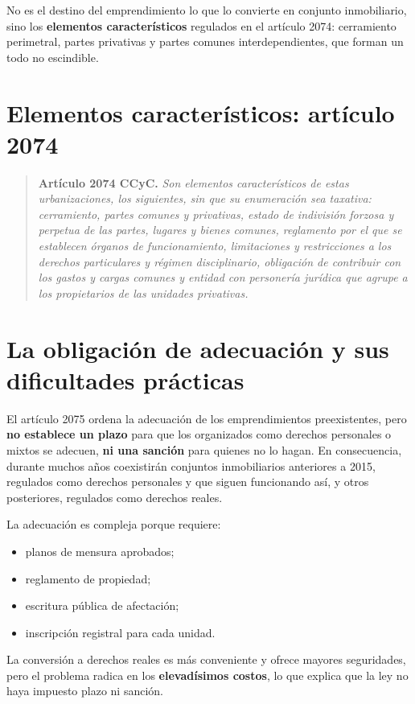 \documentclass[12pt,oneside]{book}
\begin{document}
No es el destino del emprendimiento lo que lo convierte en conjunto inmobiliario, sino los \textbf{elementos característicos} regulados en el artículo 2074: cerramiento perimetral, partes privativas y partes comunes interdependientes, que forman un todo no escindible.

\section{Elementos característicos: artículo 2074}

\begin{quote}
\textbf{Artículo 2074 CCyC.} \textit{Son elementos característicos de estas urbanizaciones, los siguientes, sin que su enumeración sea taxativa: cerramiento, partes comunes y privativas, estado de indivisión forzosa y perpetua de las partes, lugares y bienes comunes, reglamento por el que se establecen órganos de funcionamiento, limitaciones y restricciones a los derechos particulares y régimen disciplinario, obligación de contribuir con los gastos y cargas comunes y entidad con personería jurídica que agrupe a los propietarios de las unidades privativas.}
\end{quote}

\section{La obligación de adecuación y sus dificultades prácticas}

El artículo 2075 ordena la adecuación de los emprendimientos preexistentes, pero \textbf{no establece un plazo} para que los organizados como derechos personales o mixtos se adecuen, \textbf{ni una sanción} para quienes no lo hagan. En consecuencia, durante muchos años coexistirán conjuntos inmobiliarios anteriores a 2015, regulados como derechos personales y que siguen funcionando así, y otros posteriores, regulados como derechos reales.

La adecuación es compleja porque requiere:

\begin{itemize}
    \item planos de mensura aprobados;
    \item reglamento de propiedad;
    \item escritura pública de afectación;
    \item inscripción registral para cada unidad.
\end{itemize}

La conversión a derechos reales es más conveniente y ofrece mayores seguridades, pero el problema radica en los \textbf{elevadísimos costos}, lo que explica que la ley no haya impuesto plazo ni sanción.
\end{document}
